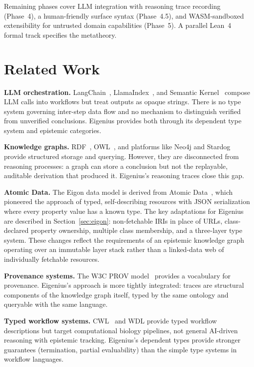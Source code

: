 \documentclass[10pt,twocolumn,letterpaper]{article}
\begin{document}
Remaining phases cover LLM integration with reasoning trace recording (Phase~4), a human-friendly surface syntax (Phase~4.5), and WASM-sandboxed extensibility for untrusted domain capabilities (Phase~5).
A parallel Lean~4 formal track specifies the metatheory.


\section{Related Work}
\label{sec:related}

\textbf{LLM orchestration.}
LangChain~\cite{langchain}, LlamaIndex~\cite{llamaindex}, and Semantic Kernel~\cite{semantickernel} compose LLM calls into workflows but treat outputs as opaque strings.
There is no type system governing inter-step data flow and no mechanism to distinguish verified from unverified conclusions.
Eigenius provides both through its dependent type system and epistemic categories.

\textbf{Knowledge graphs.}
RDF~\cite{rdf}, OWL~\cite{owl}, and platforms like Neo4j and Stardog provide structured storage and querying.
However, they are disconnected from reasoning processes: a graph can store a conclusion but not the replayable, auditable derivation that produced it.
Eigenius's reasoning traces close this gap.

\textbf{Atomic Data.}
The Eigon data model is derived from Atomic Data~\cite{atomicdata}, which pioneered the approach of typed, self-describing resources with JSON serialization where every property value has a known type.
The key adaptations for Eigenius are described in Section~\ref{sec:eigon}: non-fetchable IRIs in place of URLs, class-declared property ownership, multiple class membership, and a three-layer type system.
These changes reflect the requirements of an epistemic knowledge graph operating over an immutable layer stack rather than a linked-data web of individually fetchable resources.

\textbf{Provenance systems.}
The W3C PROV model~\cite{prov} provides a vocabulary for provenance.
Eigenius's approach is more tightly integrated: traces are structural components of the knowledge graph itself, typed by the same ontology and queryable with the same language.

\textbf{Typed workflow systems.}
CWL~\cite{cwl} and WDL provide typed workflow descriptions but target computational biology pipelines, not general AI-driven reasoning with epistemic tracking.
Eigenius's dependent types provide stronger guarantees (termination, partial evaluability) than the simple type systems in workflow languages.
\end{document}
